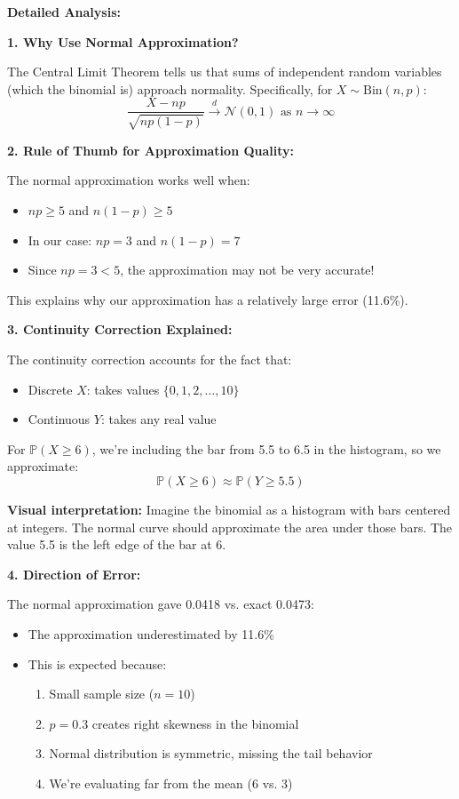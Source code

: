 \documentclass[12pt]{article}
\begin{document}
\begin{explanation}
\textbf{Detailed Analysis:}

\textbf{1. Why Use Normal Approximation?}

The Central Limit Theorem tells us that sums of independent random variables (which the binomial is) approach normality. Specifically, for \(X \sim \text{Bin}(n, p)\):
\[
\frac{X - np}{\sqrt{np(1-p)}} \xrightarrow{d} \mathcal{N}(0, 1) \text{ as } n \to \infty
\]

\textbf{2. Rule of Thumb for Approximation Quality:}

The normal approximation works well when:
\begin{itemize}
    \item \(np \geq 5\) and \(n(1-p) \geq 5\)
    \item In our case: \(np = 3\) and \(n(1-p) = 7\)
    \item Since \(np = 3 < 5\), the approximation may not be very accurate!
\end{itemize}

This explains why our approximation has a relatively large error (11.6\%).

\textbf{3. Continuity Correction Explained:}

The continuity correction accounts for the fact that:
\begin{itemize}
    \item Discrete \(X\): takes values \(\{0, 1, 2, \ldots, 10\}\)
    \item Continuous \(Y\): takes any real value
\end{itemize}

For \(\mathbb{P}(X \geq 6)\), we're including the bar from 5.5 to 6.5 in the histogram, so we approximate:
\[
\mathbb{P}(X \geq 6) \approx \mathbb{P}(Y \geq 5.5)
\]

\textbf{Visual interpretation:} Imagine the binomial as a histogram with bars centered at integers. The normal curve should approximate the area under those bars. The value 5.5 is the left edge of the bar at 6.

\textbf{4. Direction of Error:}

The normal approximation gave 0.0418 vs. exact 0.0473:
\begin{itemize}
    \item The approximation underestimated by 11.6\%
    \item This is expected because:
    \begin{enumerate}
        \item Small sample size (\(n = 10\))
        \item \(p = 0.3\) creates right skewness in the binomial
        \item Normal distribution is symmetric, missing the tail behavior
        \item We're evaluating far from the mean (6 vs. 3)
    \end{enumerate}
\end{itemize}


\end{explanation}
\end{document}
